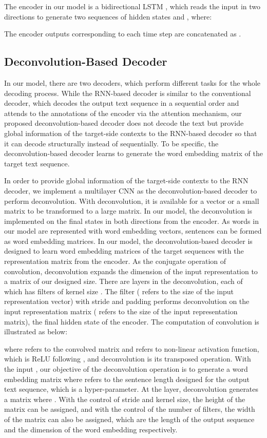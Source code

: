 \documentclass[11pt]{article}
\begin{document}
\begin{CJK}{UTF8}{gbsn}
The encoder in our model is a bidirectional LSTM \citep{LSTM},
which reads the input in two directions to generate two sequences of hidden states  and , where:

The encoder outputs corresponding to each time step are concatenated as .

\subsection{Deconvolution-Based Decoder}

In our model, there are two decoders, which perform different tasks for the whole decoding process. While the RNN-based decoder is similar to the conventional decoder, which decodes the output text sequence in a sequential order and attends to the annotations of the encoder via the attention mechanism, our proposed deconvolution-based decoder does not decode the text but provide global information of the target-side contexts to the RNN-based decoder so that it can decode structurally instead of sequentially. To be specific, the deconvolution-based decoder learns to generate the word embedding matrix of the target text sequence.

In order to provide global information of the target-side contexts to the RNN decoder, we implement a multilayer CNN as the deconvolution-based decoder to perform deconvolution. With deconvolution, it is available for a vector or a small matrix to be transformed to a large matrix. In our model, the deconvolution is implemented on the final states in both directions from the encoder. As words in our model are represented with word embedding vectors, sentences can be formed as word embedding matrices. In our model, the deconvolution-based decoder is designed to learn word embedding matrices of the target sequences with the representation matrix from the encoder. As the conjugate operation of convolution, deconvolution expands the dimension of the input representation to a matrix of our designed size. There are  layers in the deconvolution, each of which has  filters of kernel size . The  filter  ( refers to the size of the input representation vector) with stride  and padding  performs deconvolution on the input representation matrix  ( refers to the size of the input representation matrix), the final hidden state of the encoder. The computation of convolution is illustrated as below:

where  refers to the convolved matrix and  refers to non-linear activation function, which is ReLU \citep{ReLU} following \citet{deconvolution}, and deconvolution is its transposed operation. With the input , our objective of the deconvolution operation is to generate a word embedding matrix  where  refers to the sentence length designed for the output text sequence, which is a hyper-parameter. At the  layer, deconvolution generates a matrix  where . With the control of stride and kernel size, the height of the matrix can be assigned, and with the control of the number of filters, the width of the matrix can also be assigned, which are the length of the output sequence and the dimension of the word embedding respectively.


\end{CJK}
\end{document}
